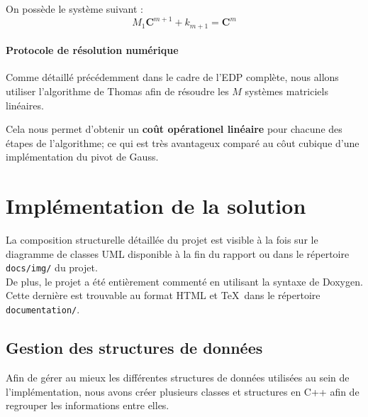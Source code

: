 \documentclass[11pt,a4paper]{article}
\newcommand*{\C}[2]{\mathbf{C}^{#1}_{#2}}
\theoremstyle{plain}
\begin{document}
On possède le système suivant :
$$\boxed{M_1\C{m+1}{} + k_{m + 1}= \C{m}{}}$$
\paragraph{Protocole de résolution numérique} Comme détaillé précédemment dans le cadre de l'EDP complète, nous allons utiliser l'algorithme de Thomas afin de résoudre les $M$ systèmes matriciels linéaires.

Cela nous permet d'obtenir un \textbf{coût opérationel linéaire} pour chacune des étapes de l'algorithme; ce qui est très avantageux comparé au côut cubique d'une implémentation du pivot de Gauss.

\section{Implémentation de la solution}
La composition structurelle détaillée du projet est visible à la fois sur le diagramme de classes UML disponible à la fin du rapport ou dans le répertoire \verb|docs/img/| du projet.
\\
De plus, le projet a été entièrement commenté en utilisant la syntaxe de Doxygen. Cette dernière est trouvable au format HTML et \TeX \ dans le répertoire \verb|documentation/|.

\subsection{Gestion des structures de données}
Afin de gérer au mieux les différentes structures de données utilisées au sein de l'implémentation, nous avons créer plusieurs classes et structures en C++ afin de regrouper les informations entre elles.
\end{document}
